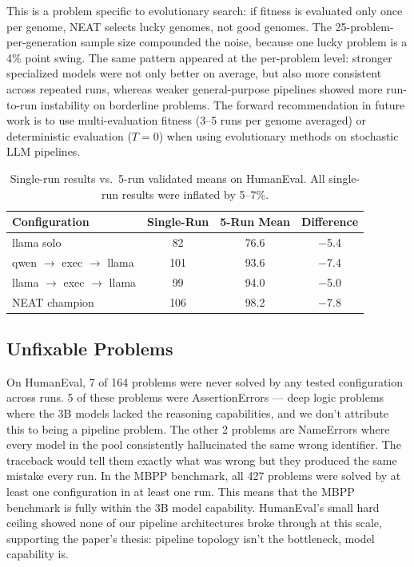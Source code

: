 \documentclass{article}
\begin{document}
This is a problem specific to evolutionary search: if fitness is evaluated only once per genome, NEAT selects lucky genomes, not good genomes. The 25-problem-per-generation sample size compounded the noise, because one lucky problem is a 4\% point swing. The same pattern appeared at the per-problem level: stronger specialized models were not only better on average, but also more consistent across repeated runs, whereas weaker general-purpose pipelines showed more run-to-run instability on borderline problems. The forward recommendation in future work is to use multi-evaluation fitness (3--5 runs per genome averaged) or deterministic evaluation ($T{=}0$) when using evolutionary methods on stochastic LLM pipelines.

\begin{table}[h]
\centering
\caption{Single-run results vs.\ 5-run validated means on HumanEval. All single-run results were inflated by 5--7\%.}
\label{tab:eval-noise}
\begin{tabular}{lccc}
\hline
\textbf{Configuration} & \textbf{Single-Run} & \textbf{5-Run Mean} & \textbf{Difference} \\
\hline
llama solo & 82 & 76.6 & $-$5.4 \\
qwen $\rightarrow$ exec $\rightarrow$ llama & 101 & 93.6 & $-$7.4 \\
llama $\rightarrow$ exec $\rightarrow$ llama & 99 & 94.0 & $-$5.0 \\
NEAT champion & 106 & 98.2 & $-$7.8 \\
\hline
\end{tabular}
\end{table}

\subsection{Unfixable Problems}
On HumanEval, 7 of 164 problems were never solved by any tested configuration across runs. 5 of these problems were AssertionErrors --- deep logic problems where the 3B models lacked the reasoning capabilities, and we don't attribute this to being a pipeline problem. The other 2 problems are NameErrors where every model in the pool consistently hallucinated the same wrong identifier. The traceback would tell them exactly what was wrong but they produced the same mistake every run. In the MBPP benchmark, all 427 problems were solved by at least one configuration in at least one run. This means that the MBPP benchmark is fully within the 3B model capability. HumanEval's small hard ceiling showed none of our pipeline architectures broke through at this scale, supporting the paper's thesis: pipeline topology isn't the bottleneck, model capability is.
\end{document}
